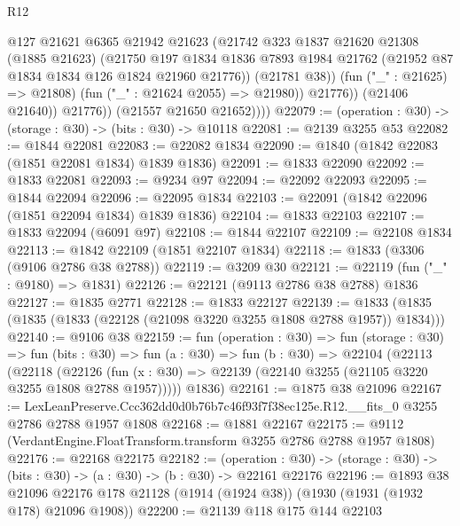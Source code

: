 \begin{lexlean}{R12}
\begin{coremodule}
                      @127
                      @21621
                      @6365
                      @21942
                      @21623
                      (@21742
                        @323
                        @1837
                        @21620
                        @21308
                        (@1885 @21623)
                        (@21750
                          @197
                          @1834
                          @1836
                          @7893
                          @1984
                          @21762
                          (@21952 @87 @1834 @1834 @126 @1824 @21960 @21776))
                        (@21781 @38))
                      (fun ("_" : @21625) => @21808)
                      (fun ("_" : @21624 @2055) => @21980))
                    @21776))
                (@21406 @21640))
              @21776))
          (@21557 @21650 @21652))))
@22079 := (operation : @30) -> (storage : @30) -> (bits : @30) -> @10118
@22081 := @2139 @3255 @53
@22082 := @1844 @22081
@22083 := @22082 @1834
@22090 := @1840 (@1842 @22083 (@1851 @22081 @1834) @1839 @1836)
@22091 := @1833 @22090
@22092 := @1833 @22081
@22093 := @9234 @97
@22094 := @22092 @22093
@22095 := @1844 @22094
@22096 := @22095 @1834
@22103 := @22091 (@1842 @22096 (@1851 @22094 @1834) @1839 @1836)
@22104 := @1833 @22103
@22107 := @1833 @22094 (@6091 @97)
@22108 := @1844 @22107
@22109 := @22108 @1834
@22113 := @1842 @22109 (@1851 @22107 @1834)
@22118 := @1833 (@3306 (@9106 @2786 @38 @2788))
@22119 := @3209 @30
@22121 := @22119 (fun ("_" : @9180) => @1831)
@22126 := @22121 (@9113 @2786 @38 @2788) @1836
@22127 := @1835 @2771
@22128 := @1833 @22127
@22139 := @1833 (@1835 (@1835 (@1833 (@22128 (@21098 @3220 @3255 @1808 @2788 @1957)) @1834)))
@22140 := @9106 @38
@22159 := fun (operation : @30) =>
  fun (storage : @30) =>
  fun (bits : @30) =>
  fun (a : @30) =>
  fun (b : @30) =>
  @22104
    (@22113
      (@22118
        (@22126 (fun (x : @30) => @22139 (@22140 @3255 (@21105 @3220 @3255 @1808 @2788 @1957)))))
      @1836)
@22161 := @1875 @38 @21096
@22167 := LexLeanPreserve.Ccc362dd0d0b76b7c46f93f7f38ec125e.R12.__fits_0
    @3255
    @2786
    @2788
    @1957
    @1808
@22168 := @1881 @22167
@22175 := @9112 (VerdantEngine.FloatTransform.transform @3255 @2786 @2788 @1957 @1808)
@22176 := @22168 @22175
@22182 := (operation : @30) ->
  (storage : @30) -> (bits : @30) -> (a : @30) -> (b : @30) -> @22161 @22176
@22196 := @1893
    @38
    @21096
    @22176
    @178
    @21128
    (@1914 (@1924 @38))
    (@1930 (@1931 (@1932 @178) @21096 @1908))
@22200 := @21139 @118 @175 @144 @22103

\end{coremodule}
\end{lexlean}
